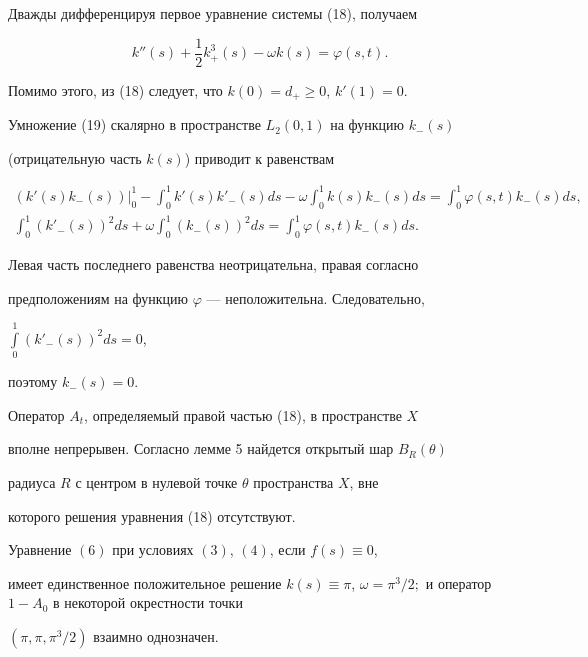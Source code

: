 \begin{pf}


Дважды дифференцируя первое уравнение системы (18), получаем


\begin{equation}


{k}''(s) + \frac{1}{2} k_{+}^3 (s) - \omega k(s)=\varphi (s,t).


\end{equation}


Помимо этого, из (18) следует, что $k(0)=d_{+} \ge 0$, ${k}'(1)=0$.


Умножение (19) скалярно в пространстве $L_2(0,1)$ на функцию $k_{-}(s)$


(отрицательную часть $k(s)$) приводит к равенствам


\begin{gather*}


({k}'(s)k_{-}(s))\big|_0^1


-\int_{0}^{1} {k}'(s)k'_-(s) ds-\omega\int_{0}^{1} k(s) k_{-}(s) ds=


\int_{0}^{1} {} \varphi (s,t) k_{-}(s) ds, \\


%


\int_0^1 (k'_-(s))^2 ds + \omega\int_{0}^{1}({k_{-}(s)})^2 ds=


\int_{0}^{1} \varphi (s,t) k_{-}(s) ds.


\end{gather*}


Левая часть последнего равенства неотрицательна, правая согласно


предположениям на функцию $\varphi $ --- неположительна. Следовательно,


$\int\limits_{0}^{1} (k'_-(s))^2 ds=0$,


поэтому $k_{-}(s)=0$.


\end{pf}





Оператор $A_t$, определяемый правой частью (18), в пространстве $X$


вполне непрерывен. Согласно лемме 5 найдется открытый шар $B_R(\theta)$


радиуса $R$ с центром в нулевой точке $\theta $ пространства $X$, вне


которого решения уравнения (18) отсутствуют.





\begin{lem}


Уравнение $(6)$ при условиях $(3)$, $(4)$, если $f(s) \equiv 0$,


имеет единственное положительное решение $k(s) \equiv \pi$, $\omega


=\pi^3/2;$ и оператор $1-A_0$ в некоторой окрестности точки


$(\pi,\pi, \pi^3/2)$ взаимно однозначен.


\end{lem}





